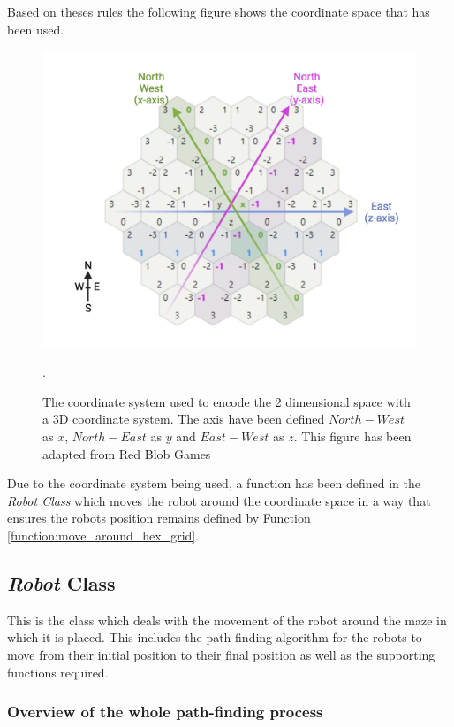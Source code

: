 Based on theses rules the following figure shows the coordinate space that has been used. 
\begin{figure}[h]
    \centering
    \includegraphics[scale=0.35]{images/hexagon_coordinates_adapted.png}
    \caption{The coordinate system used to encode the 2 dimensional space with a 3D coordinate system. The axis have been defined $North-West$ as $x$, $North-East$ as  $y$ and $East-West$ as $z$. This figure has been adapted from Red Blob Games \cite{patel_2021}}.
    \label{Hexagonal grid coordinates}
\end{figure}

Due to the coordinate system being used, a function has been defined in the \textit{Robot Class} which moves the robot around the coordinate space in a way that ensures the robots position remains defined by Function \ref{function:move_around_hex_grid}.

\pagebreak
\subsection{\textit{Robot} Class}

This is the class which deals with the movement of the robot around the maze in which it is placed. This includes the path-finding algorithm for the robots to move from their initial position to their final position as well as the supporting functions required.

\subsubsection{Overview of the whole path-finding process}

